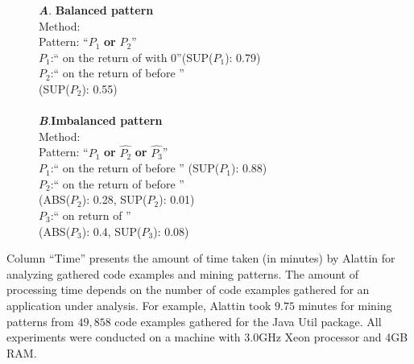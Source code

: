 \begin{figure}[t]
\textbf{\emph{A}}. \textbf{Balanced pattern}\\
Method: \\
Pattern: ``$P_1$ \textbf{or} $P_2$''\\
$P_1$:`` on the return of  with 0''(SUP($P_1$): 0.79)\\
$P_2$:`` on the return of  before
''\\ (SUP($P_2$): 0.55)\\
\\
\textbf{\emph{B}}.\textbf{Imbalanced pattern}\\
Method: \\
Pattern: ``$P_1$ \textbf{or} $\hat{P_2}$ \textbf{or} $\hat{P_3}$''\\
$P_1$:`` on the return of  \hspace*{0.2in}before  '' (SUP($P_1$): 0.88) \\
$P_2$:`` on the return of  \hspace*{0.2in}before '' \\
\hspace*{0.4in} (ABS($P_2$): 0.28, SUP($P_2$): 0.01) \\
$P_3$:`` on return of '' \\
\hspace*{0.4in} (ABS($P_3$): 0.4, SUP($P_3$): 0.08) \\
\end{figure}

Column ``Time'' presents the amount of time taken (in minutes) by Alattin for analyzing gathered code examples and mining patterns. The amount of processing time depends on the number of code examples gathered for an application under analysis. For example, Alattin took $9.75$ minutes for mining patterns from $49,858$ code examples gathered for the Java Util package. All experiments were conducted on a machine with 3.0GHz Xeon processor and 4GB RAM.

